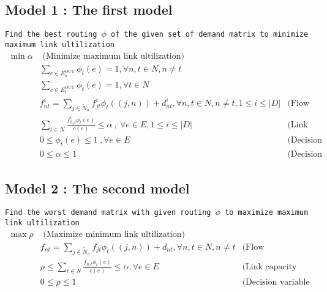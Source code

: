 \documentclass{ctexart}
\begin{document}
\subsection{Model 1 : The first model}
\texttt{Find the best routing $\phi$ of the given set of demand matrix to minimize maximum link ultilization} 
\begin{equation}
	\begin{aligned}
		\min \alpha & \text{  (Minimize maximum link ultilization)}\\
		& \sum_{e\in E_n^{\text{OUT}}}\phi_t(e)=1,\forall n,t \in N, n\not =t \\
		& \sum_{e\in E_t^{\text{OUT}}}\phi_t(e)=1,\forall t \in N \\
		& f_{nt}^i=\sum_{j\in\widetilde{N}_n}f_{jt}^i\phi_t((j,n))+d_{nt}^i, \forall n,t\in N,n\not=t,1\leq i\leq|\textit{D}| & \text{(Flow conservation)}\\
		& \sum_{t\in N}\frac{
			f_{h_et}^i\phi_{t}(e)}{c(e)} \leq \alpha\ ,\ \forall e\in E,1\leq i\leq|\textit{D}| & \text{(Link capacity constraint)} \\
		& 0\leq\phi_{t}(e)\leq1\ ,\forall e\in E\ & \text{(Decision variable constraint)}\\
		& 0\leq\alpha\leq1\ & \text{(Decision variable constraint)}
	\end{aligned}
\end{equation}

\subsection{Model 2 : The second model}
\texttt{Find the worst demand matrix with given routing $\phi$  to maximize maximum link ultilization} 
\begin{equation}
	\begin{aligned}
		\max \rho & \text{  (Maximize minimum link ultilization)}\\
		& f_{nt}=\sum_{j\in\widetilde{N}_n}f_{jt}\phi_t((j,n))+d_{nt},\forall n,t\in N,n\not=t & \text{(Flow conservation)}\\
		& \rho\leq\sum_{t\in N}\frac{
			f_{h_et}\phi_{t}(e)}{c(e)} \leq \alpha,\forall e\in E & \text{(Link capacity constraint)}\\
		& 0\leq\rho\leq1\ & \text{(Decision variable constraint)}
	\end{aligned}
\end{equation}
\end{document}
